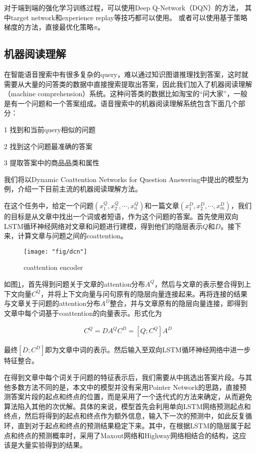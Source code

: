 对于端到端的强化学习训练过程，可以使用Deep Q-Network（DQN）的方法，
其中target network和experience replay等技巧都可以使用。
或者可以使用基于策略梯度的方法，直接最优化策略$\pi$。


\subsection{机器阅读理解}

在智能语音搜索中有很多复杂的query，难以通过知识图谱推理找到答案，这时就需要从大量的问答类的数据中直接搜索提取出答案，因此我们加入了机器阅读理解（machine comprehension）系统。这种问答类的数据比如淘宝的“问大家”，一般是有一个问题和一个答案组成。语音搜索中的机器阅读理解系统包含下面几个部分：

1 找到和当前query相似的问题

2 找到这个问题最准确的答案

3 提取答案中的商品品类和属性

我们将以Dynamic Coattention Networks for Question Answering\cite{2}中提出的模型为例，介绍一下目前主流的机器阅读理解方法。

在这个任务中，给定一个问题$(x_1^Q, x_2^Q, \cdots, x_n^Q)$和一篇文章$(x_1^D, x_2^D, \cdots, x_m^D)$，我们的目标是从文章中找出一个词或者短语，作为这个问题的答案。首先使用双向LSTM循环神经网络对文章和问题进行建模，得到他们的隐层表示$Q$和$D$。接下来，计算文章与问题之间的coattention。

\begin{figure}[ht]
	\centering
	\texttt{[image: "fig/dcn"]}
	\caption{coattention encoder}
	\label{fig:dcn}
\end{figure}

如图\ref{fig:dcn}，首先得到问题关于文章的attention分布$A^Q$，然后与文章的表示整合得到上下文向量$C^Q$，并将上下文向量与问句原有的隐层向量连接起来。再将连接的结果与文章关于问题的attention分布$A^D$整合，并与文章原有的隐层向量连接，即得到文章中每个词基于coattention的向量表示。形式化为

\begin{gather}
	C^Q=DA^Q
	C^D=[Q;C^Q]A^D
\end{gather}

最终$[D;C^D]$即为文章中词的表示。然后输入至双向LSTM循环神经网络中进一步特征整合。

在得到文章中每个词关于问题的特征表示后，我们需要从中挑选出答案片段。与其他多数方法不同的是，本文中的模型并没有采用Pointer Network的思路，直接预测答案片段的起点和终点的位置，而是采用了一个迭代式的方法来确定，从而避免算法陷入其他的次优解。具体的来说，模型首先会利用单向LSTM网络预测起点和终点，然后将得到的起点和终点作为额外信息，输入下一次的预测中，如此反复循环，直到对于起点和终点的预测结果稳定下来。其中，在根据LSTM的隐层属于起点和终点的预测概率时，采用了Maxout网络和Highway网络相结合的结构，这应该是大量实验得到的结果。

